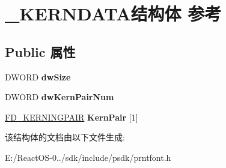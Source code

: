 \hypertarget{struct___k_e_r_n_d_a_t_a}{}\section{\+\_\+\+K\+E\+R\+N\+D\+A\+T\+A结构体 参考}
\label{struct___k_e_r_n_d_a_t_a}
\subsection*{Public 属性}
\begin{DoxyCompactItemize}
\item 
\mbox{\label{struct___k_e_r_n_d_a_t_a_aa2496894a608563b1f70fddeea77e022}} 
D\+W\+O\+RD {\bfseries dw\+Size}
\item 
\mbox{\label{struct___k_e_r_n_d_a_t_a_a51711dea0f744fc13d92b235a9ab9d2b}} 
D\+W\+O\+RD {\bfseries dw\+Kern\+Pair\+Num}
\item 
\mbox{\label{struct___k_e_r_n_d_a_t_a_aae93a0b604745441b95ea0d8489b3426}} 
\hyperlink{struct___f_d___k_e_r_n_i_n_g_p_a_i_r}{F\+D\+\_\+\+K\+E\+R\+N\+I\+N\+G\+P\+A\+IR} {\bfseries Kern\+Pair} \mbox{[}1\mbox{]}
\end{DoxyCompactItemize}


该结构体的文档由以下文件生成\+:\begin{DoxyCompactItemize}
\item 
E\+:/\+React\+O\+S-\/0../sdk/include/psdk/prntfont.\+h\end{DoxyCompactItemize}

